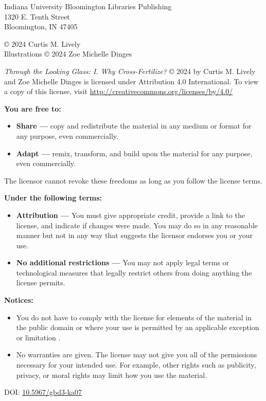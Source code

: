 \null\vfill
\begin{flushleft}
\thispagestyle{empty}
Indiana University Bloomington Libraries Publishing\\
1320 E. Tenth Street\\
Bloomington, IN 47405
\vspace{5mm}

© 2024 Curtis M. Lively\\
Illustrations © 2024 Zoe Michelle Dinges

\vspace{3mm}
\ccby

\textit{Through the Looking Glass: I. Why Cross-Fertilize?} © 2024 by Curtis M. Lively and Zoe Michelle Dinges is licensed under Attribution 4.0 International. To view a copy of this license, visit \url{http://creativecommons.org/licenses/by/4.0/}

\textbf{You are free to:}
\begin{itemize}
  \item \textbf{Share — }copy and redistribute the material in any medium or format for any purpose, even commercially.
  \item \textbf{Adapt — }remix, transform, and build upon the material for any purpose, even commercially.
   \end{itemize}
   
 The licensor cannot revoke these freedoms as long as you follow the license terms.
  
\textbf{Under the following terms:}
\begin{itemize}
  \item \textbf{Attribution —} You must give appropriate credit, provide a link to the license, and indicate if changes were made. You may do so in any reasonable manner but not in any way that suggests the licensor endorses you or your use.
  \item \textbf{No additional restrictions —} You may not apply legal terms or technological measures that legally restrict others from doing anything the license permits.
  \end{itemize}
  
\textbf{Notices:}
\begin{itemize}
 \item You do not have to comply with the license for elements of the material in the public domain or where your use is permitted by an applicable exception or limitation .
 \item No warranties are given. The license may not give you all of the permissions necessary for your intended use. For example, other rights such as publicity, privacy, or moral rights may limit how you use the material.
\end{itemize}

\vspace{5mm}
DOI: \href{https://doi.org/10.5967/gbd3-ka07}{10.5967/gbd3-ka07}
\end{flushleft}
